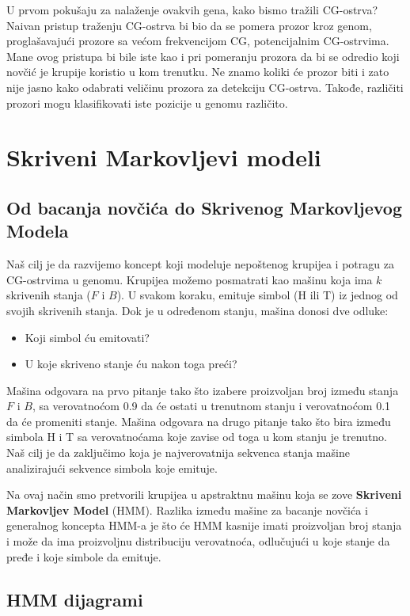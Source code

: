 U prvom pokušaju za nalaženje ovakvih gena, kako bismo tražili CG-ostrva? Naivan pristup traženju CG-ostrva bi bio da se pomera prozor kroz genom, proglašavajući prozore sa većom frekvencijom CG, potencijalnim CG-ostrvima. Mane ovog pristupa bi bile iste kao i pri pomeranju prozora da bi se odredio koji novčić je krupije koristio u kom trenutku. Ne znamo koliki će prozor biti i zato nije jasno kako odabrati veličinu prozora za detekciju CG-ostrva. Takođe, različiti prozori mogu klasifikovati iste pozicije u genomu različito.



\section{Skriveni Markovljevi modeli}
\subsection{Od bacanja novčića do Skrivenog Markovljevog Modela}

Naš cilj je da razvijemo koncept koji modeluje nepoštenog krupijea i potragu za CG-ostrvima u genomu. Krupijea možemo posmatrati kao mašinu koja ima $ k $ skrivenih stanja ($ F $ i $ B $). U svakom koraku, emituje simbol (H ili T) iz jednog od svojih skrivenih stanja. Dok je u određenom stanju, mašina donosi dve odluke:
\begin{itemize}
    \item Koji simbol ću emitovati?
    \item  U koje skriveno stanje ću nakon toga preći?
\end{itemize}

Mašina odgovara na prvo pitanje tako što izabere proizvoljan broj između stanja $ F $ i $ B $, sa verovatnoćom 0.9 da će ostati u trenutnom stanju i verovatnoćom 0.1 da će promeniti stanje. Mašina odgovara na drugo pitanje tako što bira između simbola H i T sa verovatnoćama koje zavise od toga u kom stanju je trenutno. Naš cilj je da zaključimo koja je najverovatnija sekvenca stanja mašine analizirajući sekvence simbola koje emituje.

Na ovaj način smo pretvorili krupijea u apstraktnu mašinu koja se zove \textbf{Skriveni Markovljev Model} (HMM). Razlika između mašine za bacanje novčića i generalnog koncepta HMM-a je što će HMM kasnije imati proizvoljan broj stanja i može da ima proizvoljnu distribuciju verovatnoća, odlučujući u koje stanje da pređe i koje simbole da emituje.  

\subsection{HMM dijagrami}

